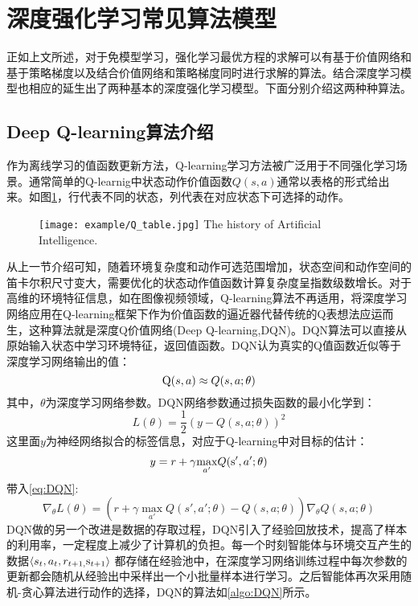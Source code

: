 \section{深度强化学习常见算法模型}
正如上文所述，对于免模型学习，强化学习最优方程的求解可以有基于价值网络和基于策略梯度以及结合价值网络和策略梯度同时进行求解的算法。结合深度学习模型也相应的延生出了两种基本的深度强化学习模型。下面分别介绍这两种种算法。
\subsection{Deep Q-learning算法介绍}
作为离线学习的值函数更新方法，Q-learning学习方法被广泛用于不同强化学习场景。通常简单的Q-learnig中状态动作价值函数$Q(s,a)$通常以表格的形式给出来。如图\ref{fig:8}，行代表不同的状态，列代表在对应状态下可选择的动作。
\begin{figure}[htpb]
	\centering
	\texttt{[image: example/Q\_table.jpg]}
	{The history of Artificial Intelligence.}
	\label{fig:8}
\end{figure}
从上一节介绍可知，随着环境复杂度和动作可选范围增加，状态空间和动作空间的笛卡尔积尺寸变大，需要优化的状态动作值函数计算复杂度呈指数级数增长。对于高维的环境特征信息，如在图像视频领域，Q-learning算法不再适用，将深度学习网络应用在Q-learning框架下作为价值函数的逼近器代替传统的Q表想法应运而生，这种算法就是深度Q价值网络(Deep Q-learning,DQN)。DQN算法可以直接从原始输入状态中学习环境特征，返回值函数。DQN认为真实的Q值函数近似等于深度学习网络输出的值：
\begin{equation}
	{\rm{Q}}(s,a) \approx Q(s,a;\theta )
\end{equation}
其中，$\theta $为深度学习网络参数。DQN网络参数通过损失函数的最小化学到：
\begin{equation}
\label{eq:DQN}
L(\theta ) = \frac{1}{2}{(y - Q(s,a;\theta ))^2}
\end{equation}
这里面$y$为神经网络拟合的标签信息，对应于Q-learning中对目标的估计：
\begin{equation}
y = r + \gamma {\max _{a'}}Q({\rm{s'}},a';\theta )
\end{equation}
带入\ref{eq:DQN}:
\begin{equation}
\label{eq:DQN2}
	{\nabla _\theta }L(\theta ) = (r + \gamma \mathop {\max }\limits_{a'} Q(s',a';\theta ) - Q(s,a;\theta )){\nabla _\theta }Q(s,a;\theta )
\end{equation}
DQN做的另一个改进是数据的存取过程，DQN引入了经验回放技术，提高了样本的利用率，一定程度上减少了计算机的负担。每一个时刻智能体与环境交互产生的数据$ \left\langle {{s_t},{a_t},{r_{t + 1,}}{{\rm{s}}_{t + 1}}} \right\rangle $ 都存储在经验池中，在深度学习网络训练过程中每次参数的更新都会随机从经验出中采样出一个小批量样本进行学习。之后智能体再次采用随机-贪心算法进行动作的选择，DQN的算法如\ref{algo:DQN}所示。

